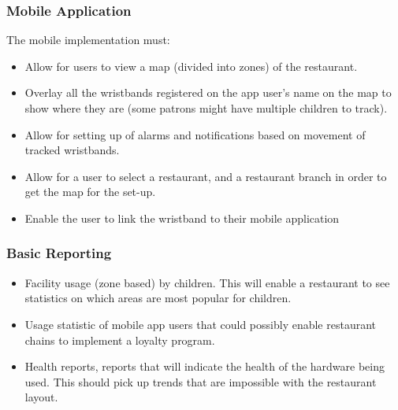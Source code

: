 \documentclass[11pt,titlepage]{article} %
\begin{document}
	\subsubsection{Mobile Application}
The mobile implementation must:
\begin{itemize}
\item Allow for users to view a map (divided into zones) of the restaurant.
\item Overlay all the wristbands registered on the app user’s name on the map to show 
where they are (some patrons might have multiple children to track).
\item Allow  for  setting  up  of  alarms  and  notifications  based  on  movement  of  tracked 
wristbands. 
\item Allow for a user to select a restaurant, and a restaurant branch in order to get the 
map for the set-up. 
\item Enable the user to link the wristband to their  mobile application
\end{itemize}


	\subsubsection{Basic Reporting}
	\begin{itemize}
	\item Facility usage  (zone based) by children. This will enable a restaurant to see statistics 
on which areas are most popular for children.
\item Usage statistic of mobile app users that could possibly enable restaurant chains to 
implement a loyalty program.
\item Health reports, reports that will indicate the health of the hardware being used. This should pick up trends that are impossible with the restaurant layout.
\end{itemize}	
\end{document}
